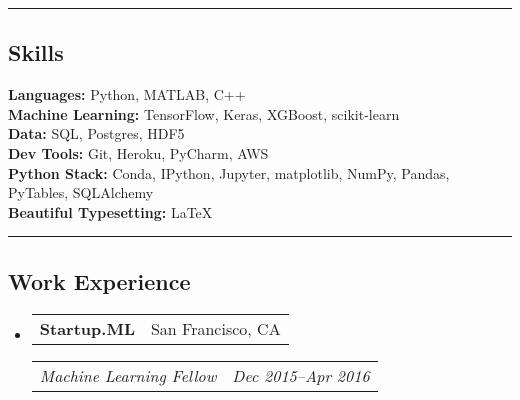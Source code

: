 \documentclass[10pt,letterpaper]{article}
\makeatletter
\newenvironment{indentsection}[1]%
{\begin{list}{}%
	{\setlength{\leftmargin}{#1}}%
	\item[]%
}
{\end{list}}
\newcommand{\headerrow}[2]
{\begin{tabular*}{\linewidth}{l@{\extracolsep{\fill}}r}
	#1 &
	#2 \\
\end{tabular*}}
\makeatother
\begin{document}
\hrule
\subsection*{Skills}
	\begin{indentsection}{\parindent}
		\textbf{Languages:} Python, MATLAB, C++\\
		\textbf{Machine Learning:} TensorFlow, Keras, XGBoost, scikit-learn\\	
		\textbf{Data:} SQL, Postgres, HDF5 \\
		\textbf{Dev Tools:}  Git, Heroku, PyCharm, AWS \\  
		\textbf{Python Stack:} Conda, IPython, Jupyter, matplotlib, NumPy, Pandas, PyTables, SQLAlchemy \\
		\textbf{Beautiful Typesetting:} \LaTeX
	\end{indentsection}

\hrule
\subsection*{Work Experience}
\begin{itemize}
	\parskip=-0.1em
	\item
	\headerrow
		{\textbf{Startup.ML}}
		{San Francisco, CA}
	\headerrow
		{\emph{Machine Learning Fellow}}
		{\emph{Dec 2015--Apr 2016}}
\end{itemize}
\end{document}
